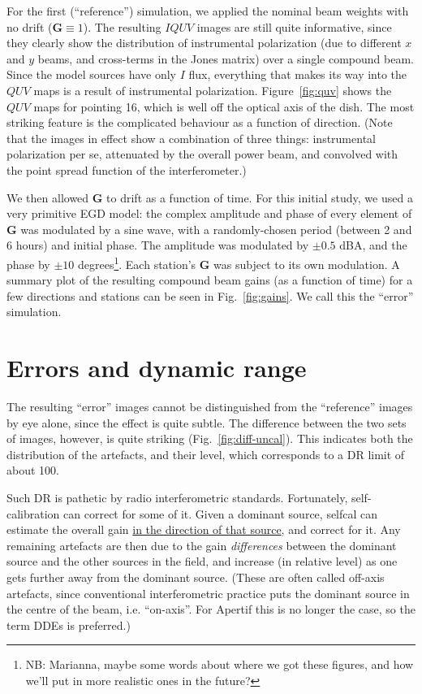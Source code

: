 \documentclass{aps2010} \special{papersize=8.5in,11in}
\begin{document}
For the first (``reference'') simulation, we applied the nominal beam weights with no drift ($\mathbf{G}\equiv1$). The resulting $IQUV$ images are still quite informative, since they clearly show the distribution of instrumental polarization (due to different $x$ and $y$ beams, and cross-terms in the Jones matrix) over a single compound beam. Since the model sources have only $I$ flux, everything that makes its way into the $QUV$ maps is a result of instrumental polarization. Figure~\ref{fig:quv} shows the $QUV$ maps for pointing 16, which is well off the optical axis of the dish. The most striking feature is the complicated behaviour as a function of direction. (Note that the images in effect show a combination of three things: instrumental polarization per se, attenuated by the overall power beam, and convolved with the point spread function of the interferometer.) 

We then allowed $\mathbf{G}$ to drift as a function of time. For this initial study, we used a very primitive EGD model: the complex amplitude and phase of every element of $\mathbf{G}$ was modulated by a  sine wave, with a randomly-chosen period (between 2 and 6 hours) and initial phase. The amplitude was modulated by $\pm0.5$ dBA, and the phase by $\pm10$ degrees\footnote{NB: Marianna, maybe some words about where we got these figures, and how we'll put in more realistic ones in the future?}. Each station's $\mathbf{G}$ was subject to its own modulation. A summary plot of the resulting compound beam gains (as a function of time) for a few directions and stations can be seen in Fig.~\ref{fig:gains}. We call this the ``error'' simulation.

\section{Errors and dynamic range}

The resulting ``error'' images cannot be distinguished from the ``reference'' images by eye alone, since the effect is quite subtle. The difference between the two sets of images, however, is quite striking (Fig.~\ref{fig:diff-uncal}). This indicates both the distribution of the artefacts, and their level, which corresponds to a DR limit of about 100.

Such DR is pathetic by radio interferometric standards. Fortunately, self-calibration can correct for some of it. Given a dominant source, selfcal can estimate the overall gain \underline{in the direction of that source}, and correct for it. Any remaining artefacts are then due to the gain \emph{differences} between the dominant source and the other sources in the field, and increase (in relative level) as one gets further away from the dominant source. (These are often called off-axis artefacts, since conventional interferometric practice puts the dominant source in the centre of the beam, i.e. ``on-axis''. For Apertif this is no longer the case, so the term DDEs is preferred.) 
\end{document}
